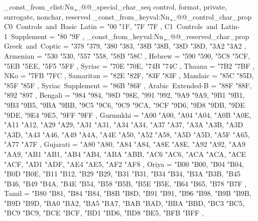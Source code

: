 \seq_const_from_clist:Nn \c_@@_special_char_seq
  { control, format, private, surrogate, nonchar, reserved }
\prop_const_from_keyval:Nn \c_@@_control_char_prop
  {
    C0~Controls~and~Basic~Latin        = { {"00} {"1F}, {"7F} {"7F} },
    C1~Controls~and~Latin-1~Supplement = { {"80} {"9F} },
  }
\prop_const_from_keyval:Nn \c_@@_reserved_char_prop
  {
    Greek~and~Coptic                               = { {"378} {"379}, {"380} {"383}, {"38B} {"38B}, {"38D} {"38D}, {"3A2} {"3A2} },
    Armenian                                       = { {"530} {"530}, {"557} {"558}, {"58B} {"58C} },
    Hebrew                                         = { {"590} {"590}, {"5C8} {"5CF}, {"5EB} {"5EE}, {"5F5} {"5FF} },
    Syriac                                         = { {"70E} {"70E}, {"74B} {"74C} },
    Thaana                                         = { {"7B2} {"7BF} },
    NKo                                            = { {"7FB} {"7FC} },
    Samaritan                                      = { {"82E} {"82F}, {"83F} {"83F} },
    Mandaic                                        = { {"85C} {"85D}, {"85F} {"85F} },
    Syriac~Supplement                              = { {"86B} {"86F} },
    Arabic~Extended-B                              = { {"88F} {"88F}, {"892} {"897} },
    Bengali                                        = { {"984} {"984}, {"98D} {"98E}, {"991} {"992}, {"9A9} {"9A9}, {"9B1} {"9B1}, {"9B3} {"9B5}, {"9BA} {"9BB}, {"9C5} {"9C6}, {"9C9} {"9CA}, {"9CF} {"9D6}, {"9D8} {"9DB}, {"9DE} {"9DE}, {"9E4} {"9E5}, {"9FF} {"9FF} },
    Gurmukhi                                       = { {"A00} {"A00}, {"A04} {"A04}, {"A0B} {"A0E}, {"A11} {"A12}, {"A29} {"A29}, {"A31} {"A31}, {"A34} {"A34}, {"A37} {"A37}, {"A3A} {"A3B}, {"A3D} {"A3D}, {"A43} {"A46}, {"A49} {"A4A}, {"A4E} {"A50}, {"A52} {"A58}, {"A5D} {"A5D}, {"A5F} {"A65}, {"A77} {"A7F} },
    Gujarati                                       = { {"A80} {"A80}, {"A84} {"A84}, {"A8E} {"A8E}, {"A92} {"A92}, {"AA9} {"AA9}, {"AB1} {"AB1}, {"AB4} {"AB4}, {"ABA} {"ABB}, {"AC6} {"AC6}, {"ACA} {"ACA}, {"ACE} {"ACF}, {"AD1} {"ADF}, {"AE4} {"AE5}, {"AF2} {"AF8} },
    Oriya                                          = { {"B00} {"B00}, {"B04} {"B04}, {"B0D} {"B0E}, {"B11} {"B12}, {"B29} {"B29}, {"B31} {"B31}, {"B34} {"B34}, {"B3A} {"B3B}, {"B45} {"B46}, {"B49} {"B4A}, {"B4E} {"B54}, {"B58} {"B5B}, {"B5E} {"B5E}, {"B64} {"B65}, {"B78} {"B7F} },
    Tamil                                          = { {"B80} {"B81}, {"B84} {"B84}, {"B8B} {"B8D}, {"B91} {"B91}, {"B96} {"B98}, {"B9B} {"B9B}, {"B9D} {"B9D}, {"BA0} {"BA2}, {"BA5} {"BA7}, {"BAB} {"BAD}, {"BBA} {"BBD}, {"BC3} {"BC5}, {"BC9} {"BC9}, {"BCE} {"BCF}, {"BD1} {"BD6}, {"BD8} {"BE5}, {"BFB} {"BFF} },
}
